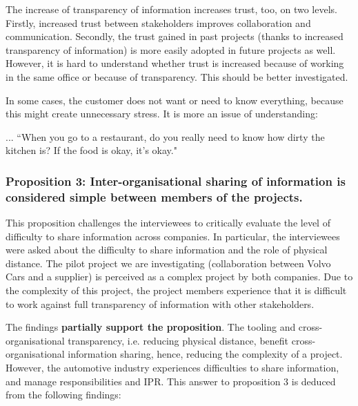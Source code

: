  The increase of transparency of information increases trust, too, on two levels. Firstly, increased trust between stakeholders improves collaboration and communication. Secondly, the trust gained in past projects (thanks to increased transparency of information) is more easily adopted in future projects as well. However, it is hard to understand whether trust is increased because of working in the same office or because of transparency. This should be better investigated. %

 In some cases, the customer does not want or need to know everything, because this might create unnecessary stress. It is more an issue of understanding: 

\begin{aquote}{...}
``When you go to a restaurant, do you really need to know how dirty the kitchen is? If the food is okay, it's okay."
\end{aquote}


\vspace{.2cm}
\subsubsection{Proposition 3: Inter-organisational sharing of information is considered simple between members of the projects.}

This proposition challenges the interviewees to critically evaluate the level of difficulty to share information across companies. In particular, the interviewees were asked about the difficulty to share information and the role of physical distance. The pilot project we are investigating (collaboration between Volvo Cars and a supplier) is perceived as a complex project by both companies. Due to the complexity of this project, the project members experience that it is difficult to work against full transparency of information with other stakeholders. 

The findings {\bf partially support the proposition}. The tooling and cross-organisational transparency, i.e. reducing physical distance, benefit cross-organisational information sharing, hence, reducing the complexity of a project. However, the automotive industry experiences difficulties to share information, and manage responsibilities and IPR. This answer to proposition 3 is deduced from the following findings:

